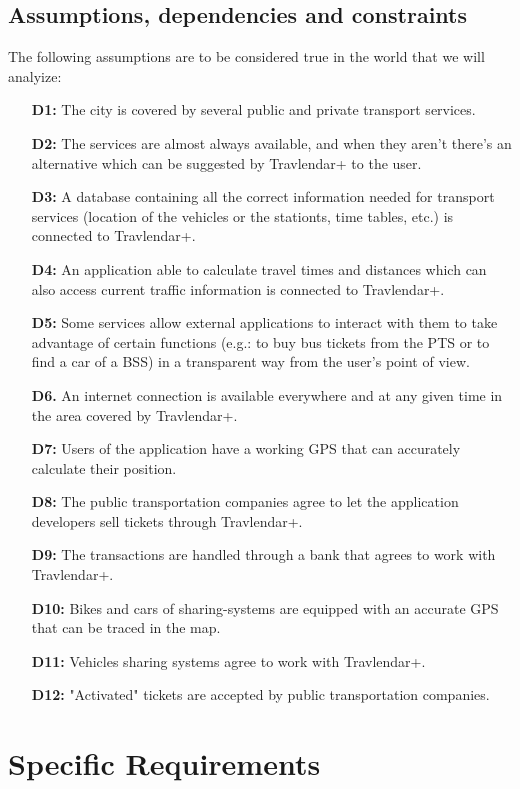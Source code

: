 \documentclass{article}
\begin{document}
\subsection{Assumptions, dependencies and constraints}
The following assumptions are to be considered true in the world that we will analyize:
\begin{enumerate}
\item[\textbf{D1:}] The city is covered by several public and private transport services.
\item[\textbf{D2:}] The services are almost always available, and when they aren’t there’s an alternative which can be suggested by Travlendar+ to the user.
\item[\textbf{D3:}] A database containing all the correct information needed for transport services (location of the vehicles or the stationts, time tables, etc.) is connected to Travlendar+.
\item[\textbf{D4:}] An application able to calculate travel times and distances which can also access current traffic information is connected to Travlendar+.
\item[\textbf{D5:}] Some services allow external applications to interact with them to take advantage of certain functions (e.g.: to buy bus tickets from the PTS or to find a car of a BSS) in a transparent way from the user's point of view.
\item[\textbf{D6.}] An internet connection is available everywhere and at any given time in the area covered by Travlendar+.
\item[\textbf{D7:}] Users of the application have a working GPS that can accurately calculate their position.
\item[\textbf{D8:}] The public transportation companies agree to let the application developers sell tickets through Travlendar+.
\item[\textbf{D9:}] The transactions are handled through a bank that agrees to work with Travlendar+.
\item[\textbf{D10:}] Bikes and cars of sharing-systems are equipped with an accurate GPS that can be traced in the map.
\item[\textbf{D11:}] Vehicles sharing systems agree to work with Travlendar+.
\item[\textbf{D12:}] "Activated" tickets are accepted by public transportation companies.
\end{enumerate}
\section{Specific Requirements}
\end{document}
